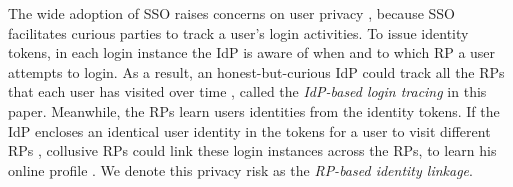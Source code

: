 The wide adoption of SSO raises concerns on user privacy \cite{NIST2017draft,SPRESSO,BrowserID,maler2008venn},
 because SSO facilitates curious parties to track a user's login activities.
To issue identity tokens,
in each login instance
 the IdP is aware of when and to which RP a user attempts to login.
As a result, an honest-but-curious IdP could track all the RPs that each user has visited over time \cite{BrowserID,SPRESSO},
 called the {\em IdP-based login tracing} in this paper.
Meanwhile, the RPs learn users identities from the identity tokens.
If the IdP encloses an identical user identity in the tokens for a user to visit different RPs \cite{maler2008venn,Google,FirefoxAccount},
     collusive RPs could link these login instances across the RPs, %
      to learn his online profile \cite{maler2008venn}.
We denote this privacy risk as the {\em RP-based identity linkage}.


%

